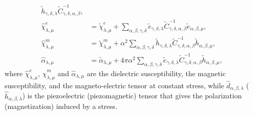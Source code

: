 \documentclass[12pt,a4paper]{article}
\begin{document}
{\begin{align}
\tilde h_{\gamma,\delta,\lambda} 
\tilde C^{-1}_{\gamma,\delta,\alpha,\beta}, \\
\hat \chi^e_{\lambda,\mu}&= \tilde \chi^e_{\lambda,\mu}
+ 
\sum_{\alpha,\beta,\gamma,\delta}\tilde e_{\gamma,\delta,\lambda}
\tilde C^{-1}_{\gamma,\delta,\alpha,\beta} \tilde e_{\alpha,\beta,\mu}, \\
\hat \chi^m_{\lambda,\mu}&= \tilde \chi^m_{\lambda,\mu}
+\alpha^2 \sum_{\alpha,\beta,\gamma,\delta}\tilde h_{\gamma,\delta,\lambda}
\tilde C^{-1}_{\gamma,\delta,\alpha,\beta} \tilde h_{\alpha,\beta,\mu}, \\
\hat \alpha_{\lambda,\mu}&= \tilde \alpha_{\lambda,\mu}
+4 \pi \alpha^2 
\sum_{\alpha,\beta,\gamma,\delta}\tilde e_{\gamma,\delta,\lambda}
\tilde C^{-1}_{\gamma,\delta,\alpha,\beta} \tilde h_{\alpha,\beta,\mu},
\end{align}
where $\hat \chi^e_{\lambda,\mu}$, $\hat \chi^m_{\lambda,\mu}$ and
$\hat \alpha_{\lambda,\mu}$ are the dielectric susceptibility, the magnetic
susceptibility, 
and the magneto-electric tensor at constant stress, while 
$\hat d_{\alpha,\beta,\lambda}$ ($\hat h_{\alpha,\beta,\lambda}$)
is the piezoelectric (piezomagnetic) tensor that
gives the polarization (magnetization) induced by a stress. 

}
\end{document}
